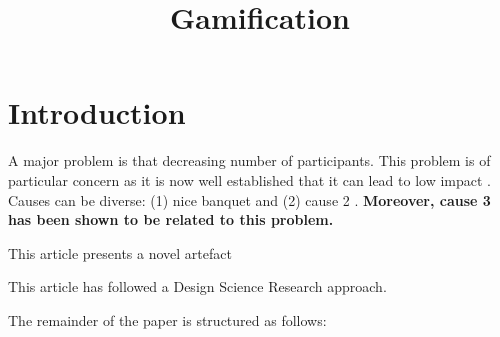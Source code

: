\documentclass{article}
\title{Gamification}
\author{}
\begin{document}
\maketitle
      

\section{Introduction}


    
A major problem is that decreasing number of participants. This problem is of particular concern as it is now well established that it can lead to low impact \cite{Hamari2014} \cite{Hamari2014} \cite{Hamari2014} \cite{Hamari2014}. Causes can be diverse: (1) nice banquet \cite{Hamari2014} and (2) cause 2 \cite{Liu2017}.\textbf{ Moreover, cause 3 has been shown to be related to this problem. } 
    

    

    
This article presents a novel artefact
    

    

      
This article has followed a Design Science Research approach.

The remainder of the paper is structured as follows: 

    
      


\end{document}
